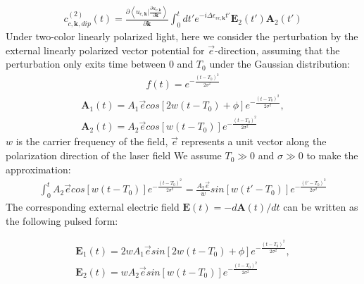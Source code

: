 \begin{align}
     c^{(2)}_{c,\mathbf k,dip}(t) =  \frac{\partial \left \langle u_{c,\mathbf k}\Big |\frac{\partial u_{v,\mathbf k}}{\partial \mathbf k} \right \rangle}{\partial \mathbf k}   \int_0^t dt' e^{-i \Delta \epsilon_{vc,\mathbf k}t'}\mathbf E_2(t')  \mathbf A_2(t') 
    \label{second_dip}
\end{align}
Under two-color linearly polarized light, here we consider the perturbation by the external linearly polarized vector potential for $\vec e$-direction, assuming that the perturbation only exits time between 0 and $T_0$ under the Gaussian distribution:
\begin{align}
f(t)=e^{-\frac{(t-T_0)^2}{2\sigma^2}}    
\end{align}
\begin{align}
   \mathbf A_1(t)=A_1 \vec e cos[2w(t-T_0)+\phi]  e^{-\frac{(t-T_0)^2}{2\sigma^2}}, \\
   \mathbf A_2(t)=A_2 \vec e cos[w(t-T_0)]  e^{-\frac{(t-T_0)^2}{2\sigma^2}}
   \label{vector}
\end{align}
$w$ is the carrier frequency of the field,  $\vec{e}$ represents a unit vector along the polarization direction of the laser field
We assume $T_0\gg0$ and $\sigma\gg0$ to make the approximation:
\begin{align}
\int_0^t A_2 \vec e cos[w(t-T_0)]  e^{-\frac{(t-T_0)^2}{2\sigma^2}}=\frac{A_2 \vec e}{w} sin[w(t'-T_0)]  e^{-\frac{(t'-T_0)^2}{2\sigma^2}}    
\end{align}
The corresponding external electric field $\mathbf E(t)=-d\mathbf A(t)/dt$ can be written as the following pulsed form:

\begin{align}
   \mathbf E_1(t)=2wA_1 \vec e sin[2w(t-T_0)+\phi]  e^{-\frac{(t-T_0)^2}{2\sigma^2}}, \\
   \mathbf E_2(t)=wA_2 \vec e sin[w(t-T_0)]  e^{-\frac{(t-T_0)^2}{2\sigma^2}}
   \label{feild}
\end{align}

